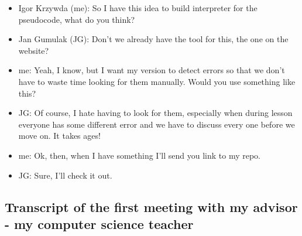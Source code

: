 \documentclass{article}
\begin{document}
    \begin{itemize}
        \item Igor Krzywda (me): So I have this idea to build interpreter for 
            the pseudocode, what do you think?
        \item Jan Gumulak (JG): Don't we already have the tool for this, the one
            on the website?
        \item me: Yeah, I know, but I want my version to detect errors so that 
            we don't have to waste time looking for them manually. Would you use
            something like this?
        \item JG: Of course, I hate having to look for them, especially when during
            lesson everyone has some different error and we have to discuss every
            one before we move on. It takes ages!
        \item me: Ok, then, when I have something I'll send you link to my repo.
        \item JG: Sure, I'll check it out.
    \end{itemize}
   
\subsection{Transcript of the first meeting with my advisor - my computer science
        teacher}
\end{document}
